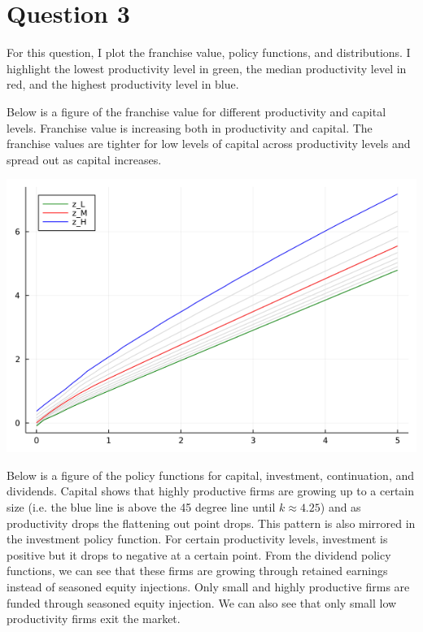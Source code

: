 \documentclass{article}
\begin{document}
\section*{Question 3}

For this question, I plot the franchise value, policy functions, and distributions.  I highlight the lowest productivity level in green, the median productivity level in red, and the highest productivity level in blue.

Below is a figure of the franchise value for different productivity and capital levels.  Franchise value is increasing both in productivity and capital.  The franchise values are tighter for low levels of capital across productivity levels and spread out as capital increases.

\includegraphics[scale = .5]{value_function.png}

\pagebreak

Below is a figure of the policy functions for capital, investment, continuation, and dividends.  Capital shows that highly productive firms are growing up to a certain size (i.e. the blue line is above the 45 degree line until $k \approx 4.25$) and as productivity drops the flattening out point drops.  This pattern is also mirrored in the investment policy function.  For certain productivity levels, investment is positive but it drops to negative at a certain point. From the dividend policy functions, we can see that these firms are growing through retained earnings instead of seasoned equity injections.  Only small and highly productive firms are funded through seasoned equity injection.  We can also see that only small low productivity firms exit the market.

\bigskip
\end{document}
